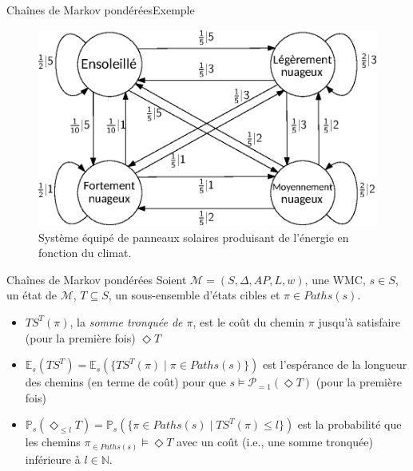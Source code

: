 \documentclass[compress]{beamer}
\begin{document}
\begin{frame}{Chaînes de Markov pondérées}{Exemple}
\begin{figure}
  \includegraphics[width=0.8\linewidth]{resources/weather}
  \caption{Système équipé de panneaux solaires produisant de l'énergie en fonction du climat.}
\end{figure}
\end{frame}

\begin{frame}{Chaînes de Markov pondérées}
    Soient $\mathcal{M} = (S, \Delta, AP, L, w)$, une WMC, $s \in S$, un état
    de $\mathcal{M}$, $T \subseteq S$, un sous-ensemble d'états cibles et $\pi \in Paths(s)$.
  \begin{itemize}
  \item $TS^T(\pi)$, la \textit{\color{fibeamer@orange}somme tronquée de $\pi$}, est le coût du chemin $\pi$ jusqu'à satisfaire {(pour la première fois)} $\Diamond T$
  \item $\mathbb{E}_s(TS^T) = \mathbb{E}_s(\{ TS^T(\pi) \; | \; \pi \in Paths(s)  \})$ est l'espérance de la longueur des chemins (en terme de coût) pour que $s \models \mathcal{P}_{=1}(\Diamond T)$ (pour la première fois)
  \item $\mathbb{P}_s(\Diamond_{\leq l}T) = \mathbb{P}_s(\{ \pi \in Paths(s) \; | \; TS^T(\pi) \leq l \})$ est la probabilité que les chemins $\pi_{\in Paths(s)} \models \Diamond T$ avec un coût (i.e., une somme tronquée) inférieure à $l \in \mathbb{N}$.
  \end{itemize}
\end{frame}
\end{document}
